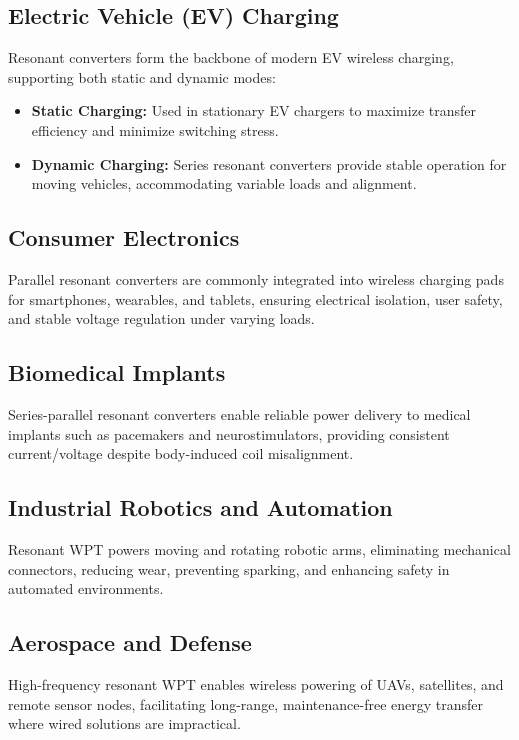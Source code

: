 \documentclass[12pt,a4paper]{report}
\begin{document}
\subsection{Electric Vehicle (EV) Charging}
Resonant converters form the backbone of modern EV wireless charging, supporting both static and dynamic modes:
\begin{itemize}
    \item \textbf{Static Charging:} Used in stationary EV chargers to maximize transfer efficiency and minimize switching stress.  
    \item \textbf{Dynamic Charging:} Series resonant converters provide stable operation for moving vehicles, accommodating variable loads and alignment.  \cite{irivennela2020wireless}
\end{itemize}

\subsection{Consumer Electronics}
Parallel resonant converters are commonly integrated into wireless charging pads for smartphones, wearables, and tablets, ensuring electrical isolation, user safety, and stable voltage regulation under varying loads.\cite{li2022singleended}

\subsection{Biomedical Implants}
Series-parallel resonant converters enable reliable power delivery to medical implants such as pacemakers and neurostimulators, providing consistent current/voltage despite body-induced coil misalignment.

\subsection{Industrial Robotics and Automation}
Resonant WPT powers moving and rotating robotic arms, eliminating mechanical connectors, reducing wear, preventing sparking, and enhancing safety in automated environments.

\subsection{Aerospace and Defense}
High-frequency resonant WPT enables wireless powering of UAVs, satellites, and remote sensor nodes, facilitating long-range, maintenance-free energy transfer where wired solutions are impractical.\cite{bertolini2021frequency}
\end{document}
